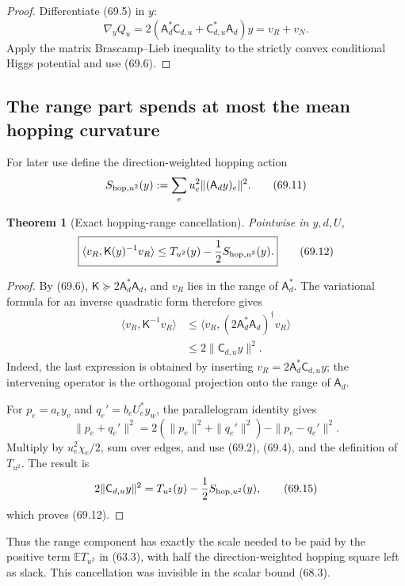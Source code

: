 \documentclass[11pt]{article}
\newtheorem{theorem}{Theorem}[section]
\theoremstyle{remark}
\begin{document}
\begin{proof}
Differentiate (69.5) in \(y\):
\[
 \nabla_yQ_u
 =2(\mathsf A_d^*\mathsf C_{d,u}
    +\mathsf C_{d,u}^*\mathsf A_d)y=v_R+v_N.     \tag{69.10}
\]
Apply the matrix Brascamp--Lieb inequality to the strictly convex
conditional Higgs potential and use (69.6).
\end{proof}

\subsection{The range part spends at most the mean hopping curvature}

For later use define the direction-weighted hopping action
\[
 S_{{\rm hop},u^2}(y)
 :=\sum_eu_e^2\|(\mathsf A_dy)_e\|^2.             \tag{69.11}
\]

\begin{theorem}[Exact hopping-range cancellation]
\label{thm:v17v69-range}
Pointwise in \(y,d,U\),
\[
\boxed{
 \langle v_R,\mathsf K(y)^{-1}v_R\rangle
 \leq T_{u^2}(y)-\frac12S_{{\rm hop},u^2}(y).}    \tag{69.12}
\]
\end{theorem}

\begin{proof}
By (69.6), \(\mathsf K\succeq2\mathsf A_d^*\mathsf A_d\), and
\(v_R\) lies in the range of \(\mathsf A_d^*\).  The variational
formula for an inverse quadratic form therefore gives
\[
\begin{aligned}
 \langle v_R,\mathsf K^{-1}v_R\rangle
 &\leq
 \langle v_R,(2\mathsf A_d^*\mathsf A_d)^\dagger v_R\rangle\\
 &\leq2\|\mathsf C_{d,u}y\|^2.                  \tag{69.13}
\end{aligned}
\]
Indeed, the last expression is obtained by inserting
\(v_R=2\mathsf A_d^*\mathsf C_{d,u}y\); the intervening operator is
the orthogonal projection onto the range of \(\mathsf A_d\).

For
\(p_e=a_ey_v\) and \(q_e'=b_eU_e^*y_w\), the parallelogram identity
gives
\[
 \|p_e+q_e'\|^2
 =2(\|p_e\|^2+\|q_e'\|^2)-\|p_e-q_e'\|^2.        \tag{69.14}
\]
Multiply by \(u_e^2\chi_e/2\), sum over edges, and use
(69.2), (69.4), and the definition of \(T_{u^2}\).  The result is
\[
 2\|\mathsf C_{d,u}y\|^2
 =T_{u^2}(y)-\frac12S_{{\rm hop},u^2}(y),         \tag{69.15}
\]
which proves (69.12).
\end{proof}

Thus the range component has exactly the scale needed to be paid by
the positive term \(\mathbb ET_{u^2}\) in (63.3), with half the
direction-weighted hopping square left as slack.  This cancellation
was invisible in the scalar bound (68.3).
\end{document}
